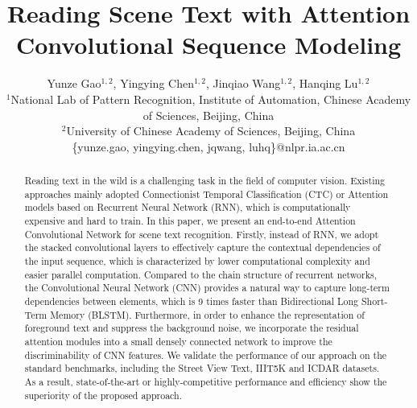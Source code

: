 \documentclass[letterpaper]{article} %
\begin{document}
%
\title{Reading Scene Text with Attention Convolutional Sequence Modeling}
\author{Yunze Gao$^{1,2}$, Yingying Chen$^{1,2}$, Jinqiao Wang$^{1,2}$, Hanqing Lu$^{1,2}$\\
$^{1}$National Lab of Pattern Recognition, Institute of Automation, Chinese Academy of Sciences, Beijing, China\\
$^{2}$University of Chinese Academy of Sciences, Beijing, China\\
\{yunze.gao, yingying.chen, jqwang, luhq\}@nlpr.ia.ac.cn\\
}
\nocopyright
\maketitle
\begin{abstract}
Reading text in the wild is a challenging task in the field of computer vision. Existing approaches mainly adopted Connectionist Temporal Classification (CTC) or Attention models based on Recurrent Neural Network (RNN), which is computationally expensive and hard to train. In this paper, we present an end-to-end Attention Convolutional Network for scene text recognition. Firstly, instead of RNN, we adopt the stacked convolutional layers to effectively capture the contextual dependencies of the input sequence, which is characterized by lower computational complexity and easier parallel computation. Compared to the chain structure of recurrent networks, the Convolutional Neural Network (CNN) provides a natural way to capture long-term dependencies between elements, which is 9 times faster than Bidirectional Long Short-Term Memory (BLSTM). Furthermore, in order to enhance the representation of foreground text and suppress the background noise, we incorporate the residual attention modules into a small densely connected network to improve the discriminability of CNN features. We validate the performance of our approach on the standard benchmarks, including the Street View Text, IIIT5K and ICDAR datasets. As a result, state-of-the-art or highly-competitive performance and efficiency show the superiority of the proposed approach.
\end{abstract}
\end{document}
